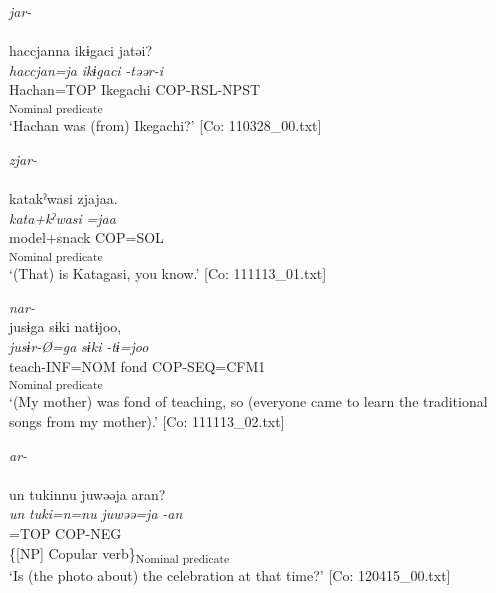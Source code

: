 \ea \label{ex:4.13}
\ea   \textit{jar-} \label{ex:4.13a}\\\\
    \gllll haccjanna  ikɨgaci  jatəi?\\
      \textit{haccjan=ja}  \textit{ikɨgaci}  \textit{-təər-i}\\
      Hachan=TOP  Ikegachi  COP-RSL-NPST\\
        [NP  Copular verb]\textsubscript{Nominal predicate}\\
    \glt       ‘Hachan was (from) Ikegachi?’      [Co: 110328\_00.txt]

\ex \textit{zjar-}\\\\
\gllll    katakˀwasi  zjajaa.\\
      \textit{kata+kˀwasi}  \textit{=jaa}\\
      model+snack  COP=SOL\\
      [NP  Copular verb]\textsubscript{Nominal predicate}\\
      \glt       ‘(That) is Katagasi, you know.’ [Co: 111113\_01.txt]

\ex  \textit{nar-}\\
\gllll   jusɨga  sɨki  natɨjoo,\\
      \textit{jusɨr-Ø=ga}  \textit{sɨki}  \textit{-tɨ=joo}\\
      teach-INF=NOM  fond  COP-SEQ=CFM1\\
        [NP  Copular verb]\textsubscript{Nominal predicate}\\
      \glt       ‘(My mother) was fond of teaching, so (everyone came to learn the traditional songs from my mother).’ [Co: 111113\_02.txt]

\ex  \textit{ar-}\\\\
\gllll     un  tukinnu  juwəəja  aran?\\
      \textit{un}  \textit{tuki=n=nu}  \textit{juwəə=ja}  \textit{-an}\\
      [that  time=DAT1=GEN  celebration]=TOP  COP-NEG\\
      \{[NP]  Copular verb\}\textsubscript{Nominal predicate}\\
      \glt       ‘Is (the photo about) the celebration at that time?’ [Co: 120415\_00.txt]
    \z
\z

